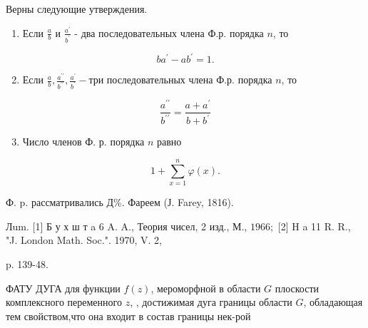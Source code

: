 \documentclass[10pt]{article}
\begin{document}
Верны следующие утверждения.



\begin{enumerate}

  \item Если $\frac{a}{b}$ и $\frac{a^{\prime}}{b^{\prime}}$ - два последовательных члена Ф.р. порядка $n$, то

\end{enumerate}



\[

b a^{\prime}-a b^{\prime}=1 .

\]



\begin{enumerate}

  \setcounter{enumi}{1}

  \item Если $\frac{a}{b}, \frac{a^{\prime \prime}}{b^{\prime \prime}}, \frac{a^{\prime}}{b^{\prime}}-т р и$ последовательных члена Ф.р. порядка $n$, то

\end{enumerate}



\[

\frac{a^{\prime \prime}}{b^{\prime \prime}}=\frac{a+a^{\prime}}{b+b^{\prime}}

\]



\begin{enumerate}

  \setcounter{enumi}{2}

  \item Число членов Ф. р. порядка $n$ равно

\end{enumerate}



\[

1+\sum_{x=1}^{n} \varphi(x) .

\]



Ф. p. рассматривались Д\%. Фареем (Ј. Farey, 1816).



Лum. [1] Б у х ш т a 6 A. A., Теория чисел, 2 изд., М., $1966 ;$ [2] H a 11 R. R., "J. London Math. Soc.". 1970, V. 2,

p. 139-48.



ФАТУ ДУГА для функции $f(z)$, мероморфной в области $G$ плоскости комплексного переменного $z$, , достижимая дуга границы области $G$, обладающая тем свойством,что она входит в состав границы нек-рой
\end{document}
